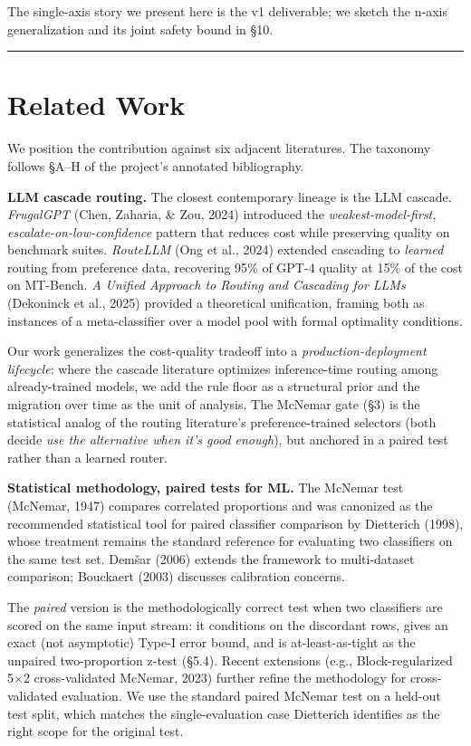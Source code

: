 The single-axis story we present here is the v1 deliverable; we sketch
the n-axis generalization and its joint safety bound in §10.

\begin{center}\rule{0.5\linewidth}{0.5pt}\end{center}

\section{Related Work}\label{related-work}

We position the contribution against six adjacent literatures. The
taxonomy follows §A--H of the project's annotated bibliography.

\textbf{LLM cascade routing.} The closest contemporary lineage is the
LLM cascade. \emph{FrugalGPT} (Chen, Zaharia, \& Zou, 2024) introduced
the \emph{weakest-model-first, escalate-on-low-confidence} pattern that
reduces cost while preserving quality on benchmark suites.
\emph{RouteLLM} (Ong et al., 2024) extended cascading to \emph{learned}
routing from preference data, recovering 95\% of GPT-4 quality at 15\%
of the cost on MT-Bench. \emph{A Unified Approach to Routing and
Cascading for LLMs} (Dekoninck et al., 2025) provided a theoretical
unification, framing both as instances of a meta-classifier over a model
pool with formal optimality conditions.

Our work generalizes the cost-quality tradeoff into a
\emph{production-deployment lifecycle}: where the cascade literature
optimizes inference-time routing among already-trained models, we add
the rule floor as a structural prior and the migration over time as the
unit of analysis. The McNemar gate (§3) is the statistical analog of the
routing literature's preference-trained selectors (both decide \emph{use
the alternative when it's good enough}), but anchored in a paired test
rather than a learned router.

\textbf{Statistical methodology, paired tests for ML.} The McNemar test
(McNemar, 1947) compares correlated proportions and was canonized as the
recommended statistical tool for paired classifier comparison by
Dietterich (1998), whose treatment remains the standard reference for
evaluating two classifiers on the same test set. Demšar (2006) extends
the framework to multi-dataset comparison; Bouckaert (2003) discusses
calibration concerns.

The \emph{paired} version is the methodologically correct test when two
classifiers are scored on the same input stream: it conditions on the
discordant rows, gives an exact (not asymptotic) Type-I error bound, and
is at-least-as-tight as the unpaired two-proportion z-test (§5.4).
Recent extensions (e.g., Block-regularized 5×2 cross-validated McNemar,
2023) further refine the methodology for cross-validated evaluation. We
use the standard paired McNemar test on a held-out test split, which
matches the single-evaluation case Dietterich identifies as the right
scope for the original test.

